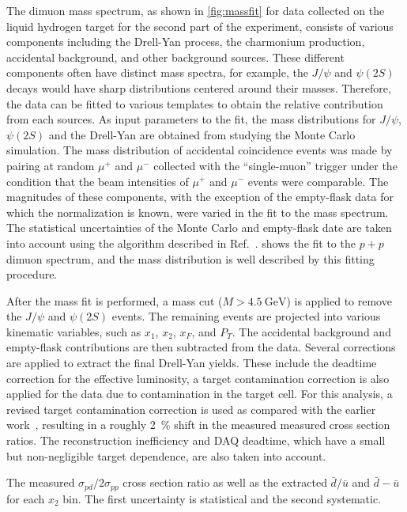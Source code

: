 \documentclass[reprint,aps,unsortedaddress,superscriptaddress,prl,floatfix,showpacs,linenumbers]{revtex4-2}
\begin{document}
The dimuon mass spectrum, as shown in \cref{fig:massfit} for data collected
on the liquid hydrogen target for the second part of the experiment, consists
of various components including the Drell-Yan process, the charmonium
production, accidental background, and other background sources.
These different components often have distinct mass spectra, for example, the $J/\psi$
and $\psi\left(2S\right)$ decays would have sharp distributions centered around their masses.
Therefore, the data can be fitted to various templates to obtain
the relative contribution from each sources.
As input parameters to the fit, the mass distributions for $J/\psi$, $\psi\left(2S\right)$
and the Drell-Yan are obtained from studying the Monte Carlo simulation. %
The mass distribution of accidental coincidence events was made by pairing at random $\mu^+$ and $\mu^-$ collected with the ``single-muon'' trigger
under the condition that the beam intensities of $\mu^+$ and $\mu^-$ events were comparable.
The magnitudes of these components,
with the exception of the empty-flask data for which the normalization is known,
were varied in the fit to the mass spectrum.
The statistical uncertainties of the Monte Carlo and empty-flask date are taken into account using the algorithm described in Ref.~\cite{barlow1993}.
 shows the fit to the $p+p$ dimuon spectrum,
and the mass distribution is well described by this fitting procedure.

After the mass fit is performed,
a mass cut ($M>\SI{4.5}{\GeV}$) is applied to remove the $J/\psi$ and $\psi\left(2S\right)$ events.
The remaining events are projected into various kinematic variables, such as $x_1$, $x_2$, $x_F$, and $P_T$.
The accidental background and empty-flask contributions are then subtracted from the data.
Several corrections are applied to extract the final Drell-Yan yields.
These include the deadtime correction for the effective luminosity,
a target contamination correction is also applied for the  data due to  contamination in the target cell.
For this analysis,
a revised target contamination correction is used as compared with the earlier work~\cite{dove2021,dove2023},
resulting in a roughly \SI{2}{\percent} shift in the measured measured cross section ratios.
The reconstruction inefficiency and DAQ deadtime, which have a small but non-negligible target dependence,
are also taken into account.

\begin{table}[htbp!]
	\centering
	\caption{The measured $\sigma_{pd}/2\sigma_{pp}$ cross section ratio as well
		as the extracted $\bar{d}/\bar{u}$ and $\bar{d}-\bar{u}$ for each $x_{2}$ bin.
		The first uncertainty is statistical and the second systematic.}
	\label{tab:dbarubar}
	\begin{adjustbox}{max width=\textwidth}
		
	\end{adjustbox}
\end{table}
\end{document}
